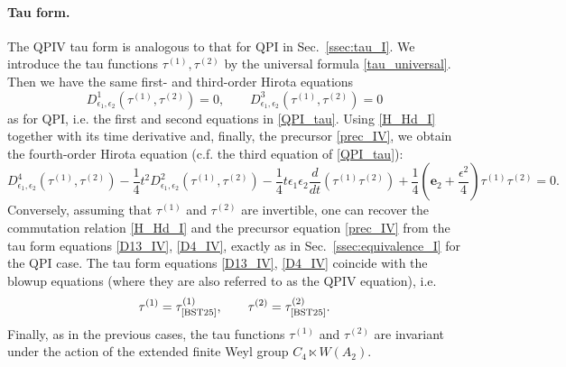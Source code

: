 \documentclass[12pt,a4paper]{article}
\numberwithin{equation}{section}
\begin{document}
\paragraph{Tau form.}
The QPIV tau form is analogous to that for QPI in Sec.~\ref{ssec:tau_I}. We introduce the tau functions $\tau^{(1)},\tau^{(2)}$ by the universal formula \eqref{tau_universal}. Then we have the same first- and third-order Hirota equations
\begin{equation}\label{D13_IV}
D^1_{\epsilon_1,\epsilon_2}\left(\tau^{(1)},\tau^{(2)}\right)=0, \qquad
D^3_{\epsilon_1,\epsilon_2}\left(\tau^{(1)},\tau^{(2)}\right)=0
\end{equation}
as for QPI, i.e. the first and second equations in \eqref{QPI_tau}.
Using \eqref{H_Hd_I} together with its time derivative and, finally, the precursor \eqref{prec_IV}, we obtain the fourth-order Hirota equation (c.f. the third equation of \eqref{QPI_tau}):
\begin{equation}\label{D4_IV}
D^4_{\epsilon_1,\epsilon_2}\left(\tau^{(1)},\tau^{(2)}\right)-\frac14t^2D^2_{\epsilon_1,\epsilon_2}\left(\tau^{(1)},\tau^{(2)}\right)-\frac14t\epsilon_1\epsilon_2\frac{d}{dt}\left(\tau^{(1)}\tau^{(2)}\right)+\frac14\left(\boldsymbol{e}_2{+}\frac{\epsilon^2}4\right)\tau^{(1)}\tau^{(2)}=0.
\end{equation}
Conversely, assuming that $\tau^{(1)}$ and $\tau^{(2)}$ are invertible, one can recover the commutation relation \eqref{H_Hd_I} and the precursor equation \eqref{prec_IV} from the tau form equations \eqref{D13_IV}, \eqref{D4_IV}, exactly as in Sec.~\ref{ssec:equivalence_I} for the QPI case. 
The tau form equations \eqref{D13_IV}, \eqref{D4_IV} coincide with the blowup equations \cite[(3.10),(3.11)]{BST25} (where they are also referred to as the QPIV equation), i.e. 
\begin{equation}\label{conn_IV}
\tau^{(1)}=\tau^{(1)}_{\textrm{\cite{BST25}}}, \qquad \tau^{(2)}=\tau^{(2)}_{\textrm{\cite{BST25}}}.    
\end{equation}
Finally, as in the previous cases, the tau functions $\tau^{(1)}$ and $\tau^{(2)}$ are invariant under the action of the extended finite Weyl group $C_4\ltimes W(A_2)$.
\end{document}
